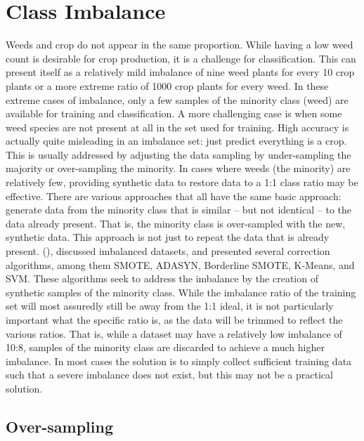 \documentclass[letterpaper, notitlepage]{report}
\begin{document}
\section{Class Imbalance}
Weeds and crop do not appear in the same proportion. While having a low weed count is desirable for crop production, it is a challenge for classification. This can present itself as a relatively mild imbalance of nine weed plants for every 10 crop plants or a more extreme ratio of 1000 crop plants for every weed. In these extreme cases of imbalance, only a few samples of the minority class (weed) are available for training and classification. A more challenging case is when some weed species are not  present at all in the set used for training.  High accuracy is actually quite misleading in an imbalance set: just predict everything is a crop. This is usually addressed by adjusting the data sampling by under-sampling the majority or over-sampling the minority. In cases where weeds (the minority) are relatively few, providing synthetic data to restore data to a 1:1 class ratio may be effective. There are various approaches that all have the same basic approach: generate data from the minority class that is similar -- but not identical -- to the data already present. That is, the minority class is over-sampled with the new, synthetic data. This approach is not just to repeat the data that is already present. \citeauthor{Fernandez2018-fw} (\citeyear{Fernandez2018-fw}), discussed imbalanced datasets, and presented several correction algorithms, among them \gls{SMOTE}, \gls{ADASYN}, Borderline SMOTE, K-Means, and \gls{SVM}. These algorithms seek to address the imbalance by the creation of synthetic samples of the minority class. While the imbalance ratio of the training set will most assuredly still be away from the 1:1 ideal, it is not particularly important what the specific ratio is, as the data will be trimmed to reflect the various ratios. That is, while a dataset may have a relatively low imbalance of 10:8, samples of the minority class are discarded to achieve a much higher imbalance. In most cases the solution is to simply collect sufficient training data such that a severe imbalance does not exist, but this may not be a practical solution. 
\subsection{Over-sampling}
\label{section:over}
\end{document}
